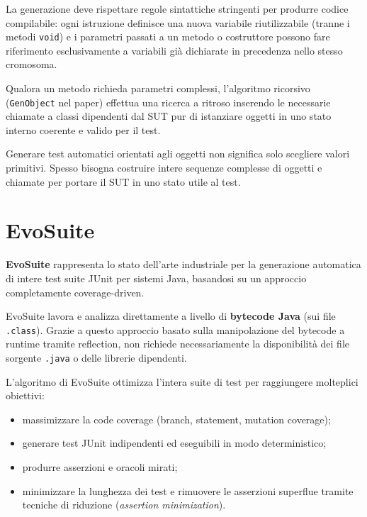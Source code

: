 La generazione deve rispettare regole sintattiche stringenti per produrre codice compilabile: ogni istruzione definisce una nuova variabile riutilizzabile (tranne i metodi \texttt{void}) e i parametri passati a un metodo o costruttore possono fare riferimento esclusivamente a variabili già dichiarate in precedenza nello stesso cromosoma.

Qualora un metodo richieda parametri complessi, l'algoritmo ricorsivo (\texttt{GenObject} nel paper) effettua una ricerca a ritroso inserendo le necessarie chiamate a classi dipendenti dal SUT pur di istanziare oggetti in uno stato interno coerente e valido per il test.

\begin{notaesame}

Generare test automatici orientati agli oggetti non significa solo scegliere valori primitivi. Spesso bisogna costruire intere sequenze complesse di oggetti e chiamate per portare il SUT in uno stato utile al test.

\end{notaesame}

\section{EvoSuite}

\textbf{EvoSuite} rappresenta lo stato dell'arte industriale per la generazione automatica di intere test suite JUnit per sistemi Java, basandosi su un approccio completamente coverage-driven.

\begin{notaslide}

EvoSuite lavora e analizza direttamente a livello di \textbf{bytecode Java} (sui file \texttt{.class}). Grazie a questo approccio basato sulla manipolazione del bytecode a runtime tramite reflection, non richiede necessariamente la disponibilità dei file sorgente \texttt{.java} o delle librerie dipendenti.

\end{notaslide}

L'algoritmo di EvoSuite ottimizza l'intera suite di test per raggiungere molteplici obiettivi:

\begin{itemize}

\item massimizzare la code coverage (branch, statement, mutation coverage);

\item generare test JUnit indipendenti ed eseguibili in modo deterministico;

\item produrre asserzioni e oracoli mirati;

\item minimizzare la lunghezza dei test e rimuovere le asserzioni superflue tramite tecniche di riduzione (\emph{assertion minimization}).

\end{itemize}

